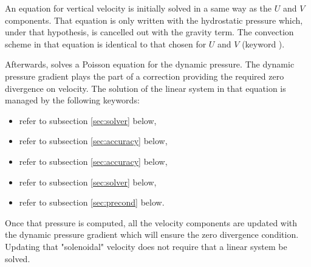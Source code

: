 An equation for vertical velocity is initially solved in a same way as the
$U$ and $V$ components. That equation is only written with the
hydrostatic pressure which, under that hypothesis, is cancelled out with the
gravity term. The convection scheme in that equation is identical to that
chosen for $U$ and $V$ (keyword ).
%
%
%
%

Afterwards,  solves a Poisson equation for the dynamic pressure. The
dynamic pressure gradient plays the part of a correction providing the required
zero divergence on velocity. The solution of the linear system in that equation
is managed by the following keywords:

\begin{itemize}
\item {} refer to subsection \ref{sec:solver} below,

\item {} refer to subsection \ref{sec:accuracy}
below,

\item {} refer to subsection \ref{sec:accuracy} below,

\item {} refer to subsection \ref{sec:solver} below,

\item {} refer to subsection \ref{sec:precond} below.
\end{itemize}

Once that pressure is computed, all the velocity components are updated with
the dynamic pressure gradient which will ensure the zero divergence condition.
Updating that "solenoidal" velocity does not require that a linear system be
solved.

